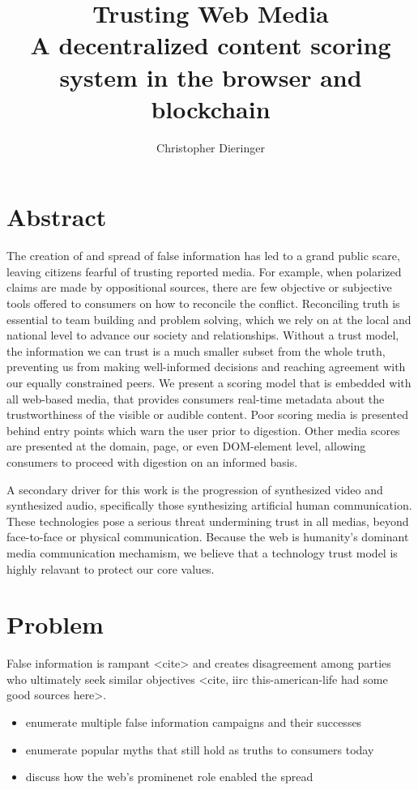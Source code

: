 \documentclass{paper}
\begin{document}
\title{%
Trusting Web Media \\
\large A decentralized content scoring system in the browser and blockchain}

\author{Christopher Dieringer}

\maketitle
\newpage

\section{Abstract}
The creation of and spread of false information has led to
a grand public scare, leaving citizens fearful of trusting
reported media.  For example, when polarized claims are made by oppositional
sources, there are few objective or subjective tools offered to consumers
on how to reconcile the conflict.  Reconciling truth is essential to
team building and problem solving, which we rely on at the local and national
level to advance our society and relationships.  Without a trust model, the
information we can trust is a much smaller subset from the whole truth,
preventing us from making well-informed decisions and reaching agreement with
our equally constrained peers.  We present a scoring model that is embedded with
all web-based media, that provides consumers real-time metadata about the
trustworthiness of the visible or audible content.  Poor scoring media is
presented behind entry points which warn the user prior to digestion.  Other
media scores are presented at the domain, page, or even DOM-element level,
allowing consumers to proceed with digestion on an informed basis.

A secondary driver for this work is the progression of synthesized video and
synthesized audio, specifically those synthesizing artificial human communication.
These technologies pose a
serious threat undermining trust in all medias, beyond face-to-face or physical
communication.  Because the web is humanity's dominant media communication
mechamism, we believe that a technology trust model is highly relavant
to protect our core values.

\section{Problem}

False information is rampant <cite> and creates disagreement among parties who
ultimately seek similar objectives <cite, iirc this-american-life had some good sources here>.
\begin{itemize}
  \item enumerate multiple false information campaigns and their successes
  \item enumerate popular myths that still hold as truths to consumers today
  \item discuss how the web's prominenet role enabled the spread
\end{itemize}
\end{document}
